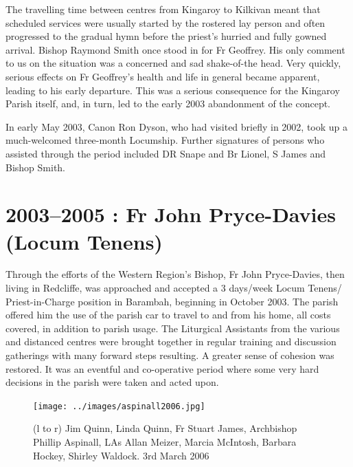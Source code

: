 The travelling time between centres from Kingaroy to Kilkivan meant that scheduled services were usually started by the rostered lay person and often progressed to the gradual hymn before the priest's hurried and fully gowned arrival. Bishop Raymond Smith once stood in for Fr Geoffrey. His only comment to us on the situation was a concerned and sad shake-of-the head. Very quickly, serious effects on Fr Geoffrey's health and life in general became apparent, leading to his early departure. This was a serious consequence for the Kingaroy Parish itself, and, in turn, led to the early 2003 abandonment of the concept.



In early May 2003, Canon Ron Dyson, who had visited briefly in 2002, took up a much-welcomed three-month Locumship. Further signatures of persons who assisted through the period included DR Snape and Br Lionel, S James and Bishop Smith.



\section{2003--2005 : Fr John Pryce-Davies (Locum Tenens)}



Through the efforts of the Western Region's Bishop, Fr John Pryce-Davies, then living in Redcliffe, was approached and accepted a 3 days/week Locum Tenens/ Priest-in-Charge position in Barambah, beginning in October 2003. The parish offered him the use of the parish car to travel to and from his home, all costs covered, in addition to parish usage. The Liturgical Assistants from the various and distanced centres were brought together in regular training and discussion gatherings with many forward steps resulting. A greater sense of cohesion was restored. It was an eventful and co-operative period where some very hard decisions in the parish were taken and acted upon.









\begin{figure}[!htb]
\begin{center}
\texttt{[image: ../images/aspinall2006.jpg]}
\caption{(l to r) Jim Quinn, Linda Quinn, Fr Stuart James, Archbishop Phillip Aspinall, LAs Allan Meizer, Marcia McIntosh, Barbara Hockey, Shirley Waldock. 3rd March 2006}
\end{center}
\end{figure}




